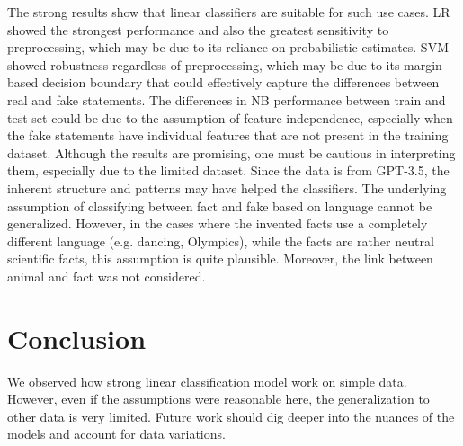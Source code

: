 \documentclass[12pt]{article}
\begin{document}
The strong results show that linear classifiers are suitable for such use cases. LR showed the strongest performance and also the greatest sensitivity to preprocessing, which may be due to its reliance on probabilistic estimates. SVM showed robustness regardless of preprocessing, which may be due to its margin-based decision boundary that could effectively capture the differences between real and fake statements. The differences in NB performance between train and test set could be due to the assumption of feature independence, especially when the fake statements have individual features that are not present in the training dataset. Although the results are promising, one must be cautious in interpreting them, especially due to the limited dataset. Since the data is from GPT-3.5, the inherent structure and patterns may have helped the classifiers. The underlying assumption of classifying between fact and fake based on language cannot be generalized. However, in the cases where the invented facts use a completely different language (e.g. dancing, Olympics), while the facts are rather neutral scientific facts, this assumption is quite plausible. Moreover, the link between animal and fact was not considered.


\section{Conclusion}
We observed how strong linear classification model work on simple data. However, even if the assumptions were reasonable here, the generalization to other data is very limited. Future work should dig deeper into the nuances of the models and account for data variations.
\end{document}
